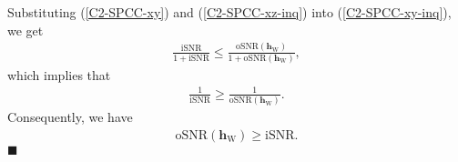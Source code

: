\documentclass[10pt,pdflatex,headrule,landscape]{beamer}
\begin{document}
\begin{frame}[allowframebreaks]
Substituting (\ref{C2-SPCC-xy}) and (\ref{C2-SPCC-xz-inq}) into (\ref{C2-SPCC-xy-inq}), we get
\begin{eqnarray*}
 \frac{ \mathrm{iSNR} } { 1 +  \mathrm{iSNR} } \leq \frac{ \mathrm{oSNR}\left( \mathbf{h}_{\mathrm{W}} \right) }
 { 1+ \mathrm{oSNR}\left( \mathbf{h}_{\mathrm{W}} \right) },
\end{eqnarray*}
which implies that
\begin{eqnarray*}
 \frac{ 1 } { \mathrm{iSNR} } \geq \frac{ 1 } { \mathrm{oSNR}\left( \mathbf{h}_{\mathrm{W}} \right) }.
\end{eqnarray*}
Consequently, we have
\begin{eqnarray*}
 \mathrm{oSNR}\left( \mathbf{h}_{\mathrm{W}} \right) \geq \mathrm{iSNR}.
\end{eqnarray*}
\hspace{4.2in} $\blacksquare$

\end{frame}
\end{document}

